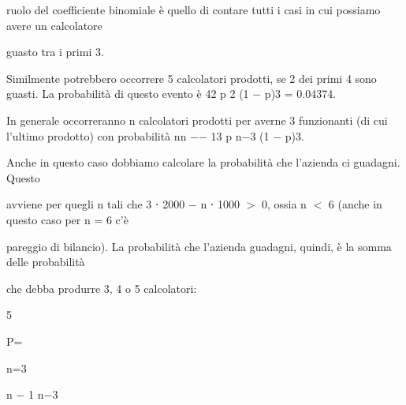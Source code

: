 \documentclass[a4paper,portrait,12pt]{article}
\begin{document}
\begin{flushleft}
ruolo del coefficiente binomiale \`{e} quello di contare tutti i casi in cui possiamo avere un calcolatore
\end{flushleft}


\begin{flushleft}
guasto tra i primi 3.
\end{flushleft}


\begin{flushleft}
Similmente potrebbero occorrere 5 calcolatori prodotti, se 2 dei primi 4 sono guasti. La probabilit\`{a} di questo evento \`{e} 42 p 2 (1 $-$ p)3 = 0.04374.
\end{flushleft}


\begin{flushleft}
In generale occorreranno n calcolatori prodotti per averne 3 funzionanti (di cui l'ultimo prodotto) con probabilit\`{a} nn $-$$-$ 13 p n$-$3 (1 $-$ p)3.
\end{flushleft}


\begin{flushleft}
Anche in questo caso dobbiamo calcolare la probabilit\`{a} che l'azienda ci guadagni. Questo
\end{flushleft}


\begin{flushleft}
avviene per quegli n tali che 3 ⋅ 2000 $-$ n ⋅ 1000 $>$ 0, ossia n $<$ 6 (anche in questo caso per n = 6 c'\`{e}
\end{flushleft}


\begin{flushleft}
pareggio di bilancio). La probabilit\`{a} che l'azienda guadagni, quindi, \`{e} la somma delle probabilit\`{a}
\end{flushleft}


\begin{flushleft}
che debba produrre 3, 4 o 5 calcolatori:
\end{flushleft}


5





\begin{flushleft}
P=
\end{flushleft}


\begin{flushleft}
n=3
\end{flushleft}





\begin{flushleft}
n $-$ 1 n$-$3
\end{flushleft}
\end{document}
